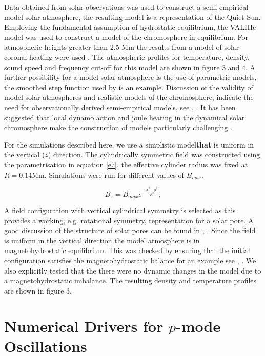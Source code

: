 \documentclass[physics,article,submit,pdftex,moreauthors]{Definitions/mdpi}
\begin{document}
Data obtained from solar observations was used to construct a semi-empirical model solar atmosphere, the resulting model is a representation of the Quiet Sun. Employing the fundamental assumption of hydrostatic equilibrium, the VALIIIc model \citet{Vernazza1981} was used to construct a model of the chromosphere in equilibrium. For atmospheric heights greater than 2.5 Mm the results from a model of solar coronal heating were used \citet{McWhirter1975}. The atmospheric profiles for temperature, density, sound speed and frequency cut-off for this model are shown in figure 3 and 4.
A further possibility for a model solar atmosphere is the use of parametric models, the smoothed step function used by \citet{Murawski2010} is an example. Discussion of the validity of model solar atmospheres and realistic models of the chromosphere,  indicate the need for observationally derived semi-empirical models, see \citet{Carlsson1995}, \citet{Kalkofen2012}. It has been suggested that local dynamo action and joule heating in the dynamical solar chromosphere make the construction of models particularly challenging \citet{Leenaarts2011}.


For the simulations described here, we use a simplistic model{\bf that} is uniform in the vertical ($z$) direction. The cylindrically symmetric field was constructed using  the parametrisation in equation \ref{e7}, the effective cylinder radius was fixed at $R=0.14$Mm. Simulations were run for different values of $B_{max}$.

\begin{equation}
B_{z}=B_{max} e^{-\frac{x^2+y^2}{R^2}} , \label{e7}
\end{equation}

A field configuration with vertical cylindrical symmetry is selected as this provides a working, e.g. rotational symmetry, representation for  a solar pore.    A good discussion of the structure of  solar pores can be found in \citet{Simon1970}, \citet{Cameron2007}.
Since the field is uniform in the vertical direction the model atmosphere is in magnetohydrostatic equilibrium. This was checked by ensuring that the initial configuration satisfies the magnetohydrostatic balance for an example see \citet{Schussler2005}, \citet{Gent2013}. We also explicitly tested that the there were no dynamic changes in the model due to a magnetohydrostatic imbalance. The resulting density and temperature profiles are shown in figure 3. 


\section{Numerical Drivers for $p$-mode Oscillations}
\end{document}
